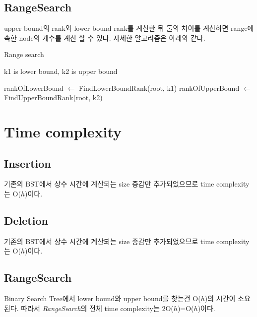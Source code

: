 \documentclass[a4paper, 11pt]{article}
\begin{document}
\subsection{RangeSearch}
upper bound의 rank와 lower bound rank를 계산한 뒤 둘의 차이를 계산하면 range에 속한 node의 개수를 계산 할 수 있다. 자세한 알고리즘은 아래와 같다.

\begin{algorithm}
	\caption{Range search}
	\begin{algorithmic}
		 \Comment k1 is lower bound, k2 is upper bound
				\State {}
			\EndIf
			
			\State rankOfLowerBound $\gets$ FindLowerBoundRank(root, k1)
			\State rankOfUpperBound $\gets$ FindUpperBoundRank(root, k2)
			
			\State {}
		\EndFunction
	\end{algorithmic}
\end{algorithm}

\section{Time complexity}
\subsection{Insertion}
기존의 BST에서 상수 시간에 계산되는 size 증감만 추가되었으므로 time complexity는 O($h$)이다.

\subsection{Deletion}
기존의 BST에서 상수 시간에 계산되는 size 증감만 추가되었으므로 time complexity는 O($h$)이다.

\subsection{RangeSearch}
Binary Search Tree에서 lower bound와 upper bound를 찾는건 O($h$)의 시간이 소요된다. 따라서 \emph{RangeSearch}의 전체 time complexity는 2O($h$)=O($h$)이다.
\end{document}
